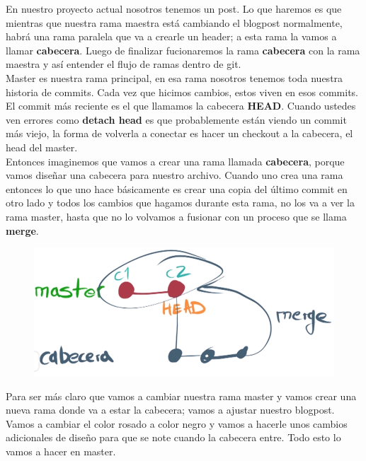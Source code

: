 \documentclass{article}
\begin{document}
En nuestro proyecto actual nosotros tenemos un post. Lo que haremos es que
mientras que nuestra rama maestra está cambiando el blogpost normalmente, habrá
una rama paralela que va a crearle un header; a esta rama la vamos a llamar
\textbf{cabecera}. Luego de finalizar fucionaremos la rama \textbf{cabecera}
con la rama maestra y así entender el flujo de ramas dentro de git.\\

Master es nuestra rama principal, en esa rama nosotros tenemos toda nuestra
historia de commits. Cada vez que hicimos cambios, estos viven en esos commits.
El commit más reciente es el que llamamos la cabecera \textbf{HEAD}. Cuando
ustedes ven errores como \textbf{detach head} es que probablemente están viendo
un commit más viejo, la forma de volverla a conectar es hacer un checkout a la
cabecera, el head del master.\\

Entonces imaginemos que vamos a crear una rama llamada \textbf{cabecera},
porque vamos diseñar una cabecera para nuestro archivo. Cuando uno crea una
rama entonces lo que uno hace básicamente es crear una copia del último commit
en otro lado y todos los cambios que hagamos durante esta rama, no los va a ver
la rama master, hasta que no lo volvamos a fusionar con un proceso que se llama
\textbf{merge}.\\

\begin{figure}[h!]
  \centering
  \includegraphics[scale=0.6]{./Pictures/129_cabecera_branch.png}
\end{figure}

Para ser más claro que vamos a cambiar nuestra rama master y vamos crear una
nueva rama donde va a estar la cabecera; vamos a ajustar nuestro blogpost.
Vamos a cambiar el color rosado a color negro y vamos a hacerle unos cambios
adicionales de diseño para que se note cuando la cabecera entre. Todo esto lo
vamos a hacer en master.
\end{document}
